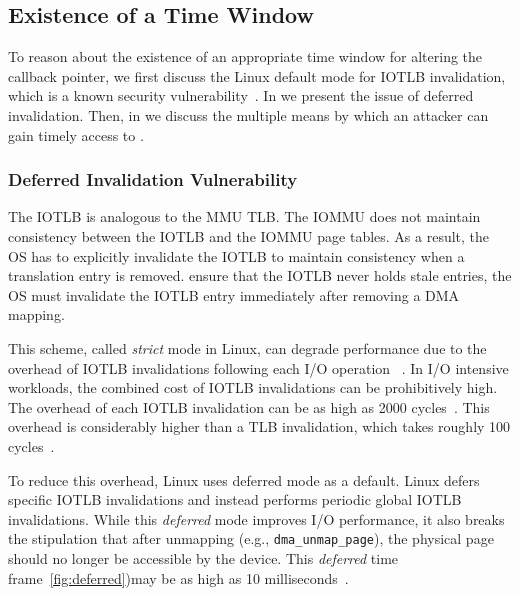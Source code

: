 \subsection{Existence of a Time Window}\label{sec:timely}
To reason about the existence of an appropriate time window for altering the callback pointer, we first discuss the Linux default mode for IOTLB invalidation, which is a known security vulnerability~\cite{MMT16,MSMT18}.
In \DIFdelbegin {}\DIFdelend \DIFaddbegin {}\DIFaddend we present the issue of deferred invalidation. Then, in \DIFdelbegin {}\DIFdelend \DIFaddbegin {}\DIFaddend we discuss the multiple means by which an attacker can gain timely access to \shinfo.

\subsubsection{Deferred Invalidation Vulnerability}\label{sec:deferred}
The IOTLB is analogous to the MMU TLB. The IOMMU does not maintain consistency between the IOTLB and the IOMMU page tables. As a result, the OS has to explicitly invalidate the IOTLB to maintain consistency when a translation entry is removed. \DIFdelbegin {}\DIFdelend \DIFaddbegin {}\DIFaddend ensure that the IOTLB never holds stale entries, the OS must invalidate the IOTLB entry immediately after removing a DMA mapping. 

This scheme, called \emph{strict} mode in Linux, can degrade performance due to the overhead of IOTLB invalidations following each I/O operation ~\cite{MMT16,MSMT18,Peleg15}. In I/O intensive workloads, the combined cost of IOTLB invalidations can be prohibitively high. The overhead of each IOTLB invalidation can be as high as 2000 cycles~\cite{ABYTS11}. This overhead is considerably higher than a TLB invalidation, which takes roughly 100 cycles~\cite{Han14}. 

To reduce this overhead, Linux uses deferred mode as a default. Linux defers specific IOTLB invalidations and instead performs periodic global IOTLB invalidations. While this \emph{deferred} mode improves I/O performance, it also breaks the stipulation that after unmapping (e.g., \texttt{dma\_unmap\_page}), the physical page should no longer be accessible by the device. This \emph{deferred} time frame\DIFdelbegin {}\DIFdelend \DIFaddbegin {}\DIFaddend ~\ref{fig:deferred})\DIFaddbegin \DIFadd{, }\DIFaddend may be as high as 10 milliseconds~\cite{MSMT18}.

